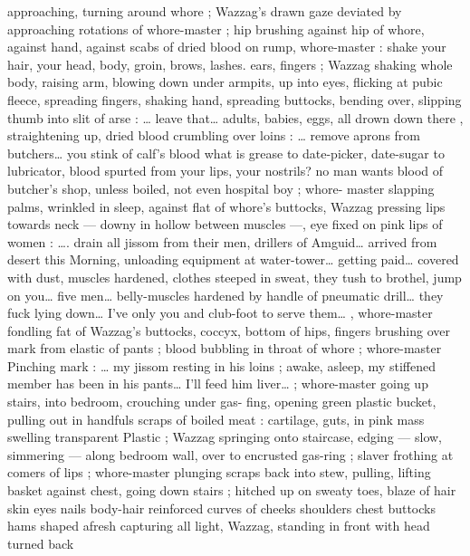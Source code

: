 approaching, turning around whore ; Wazzag's drawn gaze deviated 
by approaching rotations of whore-master ; hip brushing against hip 
of whore, against hand, against scabs of dried blood on rump, 
whore-master :{\td} {\gl} {\td} shake your hair, your head, body, groin, brows, 
lashes. ears, fingers{\td} {\gr} ; Wazzag shaking whole body, raising arm, 
blowing down under armpits, up into eyes, flicking at pubic fleece, 
spreading fingers, shaking hand, spreading buttocks, bending over, 
slipping thumb into slit of arse : {\gl}{\ldots} leave that{\ldots} adults, babies, eggs, 
all drown down there{\td} {\gr}, straightening up, dried blood crumbling 
over loins : {\gl}{\ldots} remove aprons from butchers{\ldots} you stink of calf's 
blood{\td} what is grease to date-picker, date-sugar to lubricator, blood 
spurted from your lips, your nostrils?{\td} no man wants blood of 
butcher's shop, unless boiled,{\td} not even hospital boy {\gr} ; whore- 
master slapping palms, wrinkled in sleep, against flat of whore's 
buttocks, Wazzag pressing lips towards neck --- downy in hollow 
between muscles ---, eye fixed on pink lips of women : {\gl}{\ldots}. drain all 
jissom from their men, drillers of Amguid{\ldots} arrived from desert this 
Morning, unloading equipment at water-tower{\ldots} getting paid{\ldots} 
covered with dust, muscles hardened, clothes steeped in sweat, they 
tush to brothel, jump on you{\ldots} five men{\ldots} belly-muscles hardened by 
handle of pneumatic drill{\ldots} they fuck lying down{\ldots} I've only you and 
club-foot to serve them{\ldots} {\gr}, whore-master fondling fat of Wazzag's 
buttocks, coccyx, bottom of hips, fingers brushing over mark from 
elastic of pants ; blood bubbling in throat of whore ; whore-master 
Pinching mark : {\gl} {\ldots} my jissom resting in his loins ; awake, asleep, my 
stiffened member has been in his pants{\ldots} I'll feed him liver{\ldots} {\gr} ; 
whore-master going up stairs, into bedroom, crouching under gas- 
fing, opening green plastic bucket, pulling out in handfuls scraps of 
boiled meat : cartilage, guts, in pink mass swelling transparent 
Plastic ; Wazzag springing onto staircase, edging --- slow, simmering 
--- along bedroom wall, over to encrusted gas-ring ; slaver frothing 
at comers of lips ; whore-master plunging scraps back into stew, 
pulling, lifting basket against chest, going down stairs ; hitched up 
on sweaty toes, blaze of hair skin eyes nails body-hair reinforced 
curves of cheeks shoulders chest buttocks hams shaped afresh 
capturing all light, Wazzag, standing in front with head turned back 
